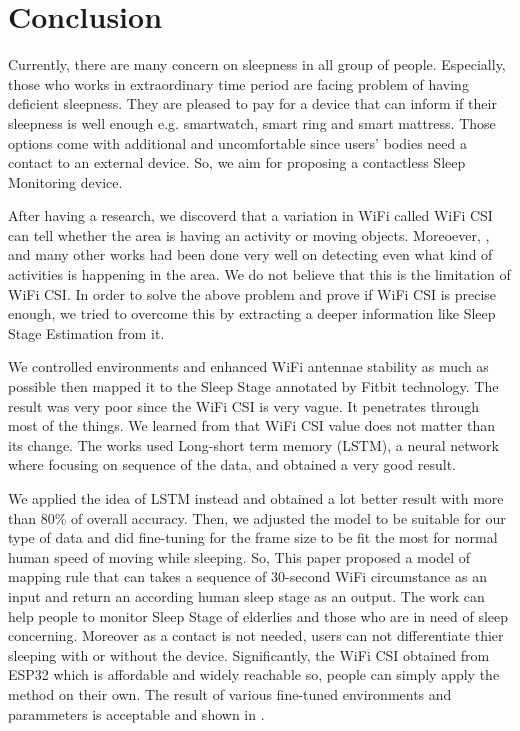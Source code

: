 \documentclass[10pt,letterpaper]{article}
\begin{document}
	\section*{Conclusion}
	

	Currently, there are many concern on sleepness in all group of people. Especially, those who works in extraordinary time period are facing problem of having deficient sleepness. They are pleased to pay for a device that can inform if their sleepness is well enough e.g. smartwatch, smart ring and smart mattress. Those options come with additional and uncomfortable since users' bodies need a contact to an external device. So, we aim for proposing a contactless Sleep Monitoring device.
	
	After having a research, we discoverd that a variation in WiFi called WiFi CSI can tell whether the area is having an activity or moving objects. Moreoever, \cite{chowdhuryTZ}, \cite{zouH} and many other works had been done very well on detecting even what kind of activities is happening in the area. We do not believe that this is the limitation of WiFi CSI. In order to solve the above problem and prove if WiFi CSI is precise enough, we tried to overcome this by extracting a deeper information like Sleep Stage Estimation from it. 
	
	We controlled environments and enhanced WiFi antennae stability as much as possible then mapped it to the Sleep Stage annotated by Fitbit technology. The result was very poor since the WiFi CSI is very vague. It penetrates through most of the things. We learned from \cite{bib20} that WiFi CSI value does not matter than its change. The works used Long-short term memory (LSTM), a neural network where focusing on sequence of the data, and obtained a very good result.  
	
	We applied the idea of LSTM instead and obtained a lot better result with more than 80\% of overall accuracy. Then, we adjusted the model to be suitable for our type of data and did fine-tuning for the frame size to be fit the most for normal human speed of moving while sleeping. So, This paper proposed a model of mapping rule that can takes a sequence of 30-second WiFi circumstance as an input and return an according human sleep stage as an output. The work can help people to monitor Sleep Stage of elderlies and those who are in need of sleep concerning. Moreover as a contact is not needed, users can not differentiate thier sleeping with or without the device. Significantly, the WiFi CSI obtained from ESP32 which is affordable and widely reachable so, people can simply apply the method on their own. The result of various fine-tuned environments and parammeters is acceptable and shown in .
	
\end{document}
